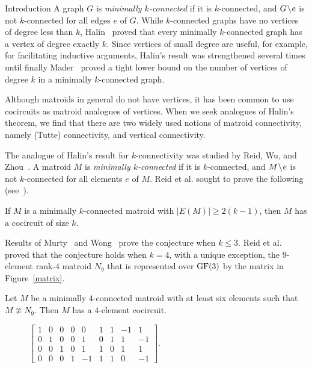 \documentclass[12pt]{amsart}
\begin{document}
\begin{section}{Introduction}
A graph $G$ is \emph{minimally $k$-connected} if it is $k$-connected, and $G \!\setminus\! e$ is not $k$-connected for all edges $e$ of $G$.
While $k$-connected graphs have no vertices of degree less than $k$, Halin~\cite{Halin} proved that every minimally $k$-connected graph has a vertex of degree exactly $k$.
Since vertices of small degree are useful, for example, for facilitating inductive arguments, Halin's result was strengthened several times until finally Mader~\cite{Mader} proved a tight lower bound on the number of vertices of degree $k$ in a minimally $k$-connected graph.

Although matroids in general do not have vertices, it has been common to use cocircuits as matroid analogues of vertices.
When we seek analogues of Halin's theorem, we find that there are two widely used notions of matroid connectivity, namely (Tutte) connectivity, and vertical connectivity.

The analogue of Halin's result for $k$-connectivity was studied by Reid, Wu, and Zhou~\cite{RWZ}.
A matroid $M$ is \emph{minimally $k$-connected} if it is $k$-connected, and $M \!\setminus\! e$ is not $k$-connected for all elements $e$ of $M$.
Reid et al. sought to prove the following (see~\cite[Problem 14.4.9]{Oxley92}).

\begin{conjecture} \label{k-conn}
If $M$ is a minimally $k$-connected matroid with $|E(M)| \ge 2(k-1)$, then $M$ has a cocircuit of size $k$.
\end{conjecture}

Results of Murty~\cite{Murty} and Wong~\cite{Wong} prove the conjecture when $k \le 3$.
Reid et al.~\cite{RWZ} proved that the conjecture holds when $k = 4$, with a unique exception, the $9$-element rank-$4$ matroid $N_9$ that is represented over $\operatorname{GF}(3)$ by the matrix in Figure~\ref{matrix}.


\begin{theorem} \label{RWZ}
Let $M$ be a minimally $4$-connected matroid with at least six elements such that $M \ncong N_9$. 
Then $M$ has a $4$-element cocircuit.
\end{theorem}


\begin{figure}
\begin{center}
		$\begin{bmatrix}
1 & 0 & 0 & 0 & 0 & 1 & 1 & -1 & 1 \\
0 & 1 & 0 & 0 & 1 & 0 & 1 & 1  & -1 \\
0 & 0 & 1 & 0 & 1 & 1 & 0 & 1  & 1 \\
0 & 0 & 0 & 1 & -1& 1 & 1 & 0  & -1
\end{bmatrix}.$
	\end{center} 
	

\end{figure}
\end{section}
\end{document}
